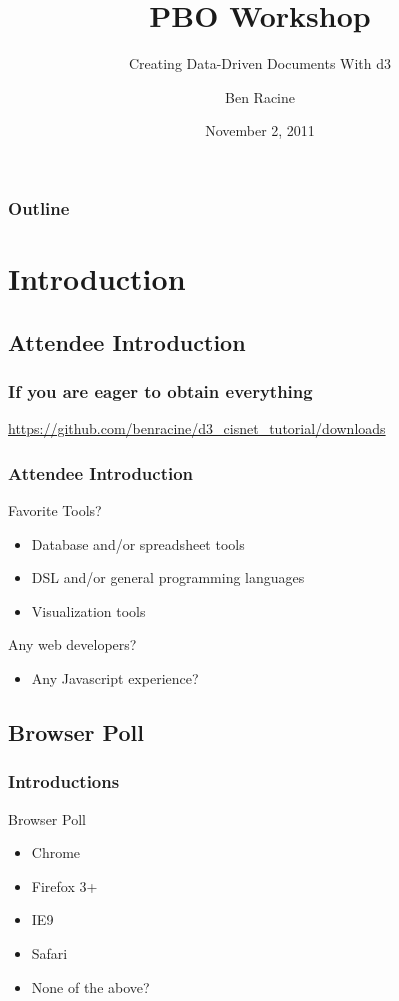 \documentclass{beamer}
\title{PBO Workshop}
\subtitle{Creating Data-Driven Documents With d3}
\author{Ben Racine \inst{1} }
\institute{\inst{1} Cornerstone Systems NW }
\date{November 2, 2011}
\begin{document}
\begin{frame}
    \frametitle{}
    \titlepage
\end{frame}



\begin{frame}
    \scriptsize{
        \frametitle{Outline}
        \tableofcontents[pausesections]
    }
\end{frame}



\section{Introduction}


\subsection{Attendee Introduction}


\begin{frame}
    \frametitle{If you are eager to obtain everything}
    \href{https://github.com/benracine/d3_cisnet_tutorial/downloads}{https://github.com/benracine/d3_cisnet_tutorial/downloads}
\end{frame}


\begin{frame}
    \frametitle{Attendee Introduction}
\pause
    \begin{block}{Favorite Tools?} 
\pause
    \begin{itemize}
    \item Database and/or spreadsheet tools
\pause
    \item DSL and/or general programming languages
\pause
    \item Visualization tools
    \end{itemize}
    \end{block}
\pause
    \begin{block}{Any web developers?}
        \begin{itemize}
\pause
        \item Any Javascript experience?
        \end{itemize}
    \end{block}
\end{frame}


\subsection{Browser Poll}

\begin{frame}
    \frametitle{Introductions}
\pause
    \begin{block}{Browser Poll}
        \begin{itemize}
\pause
        \item Chrome
\pause
        \item Firefox 3+
\pause
        \item IE9
\pause
        \item Safari
\pause
        \item None of the above?
        \end{itemize}
    \end{block}
\end{frame}
\end{document}
